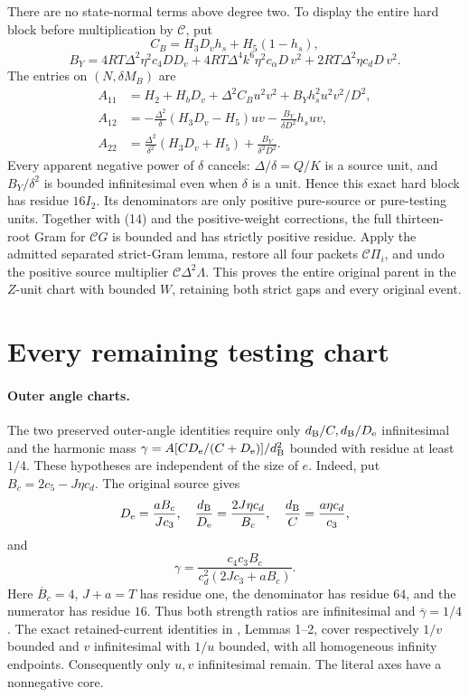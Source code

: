 There are no state-normal terms above degree two. To display the
entire hard block before multiplication by $\mathcal C$, put
\[
 C_B=H_3D_vh_s+H_5(1-h_s),
\]
\[
 B_Y=4RT\Delta^2\eta^2c_4DD_v
      +4RT\Delta^4k^6\eta^2c_\alpha D\,v^2
      +2RT\Delta^2\eta c_dD\,v^2.
\]
The entries on $(N,\delta M_B)$ are
\begin{align*}
 A_{11}&=H_2+H_bD_v+\Delta^2C_Bu^2v^2
                         +B_Yh_s^2u^2v^2/D^2,\\
 A_{12}&=-\frac{\Delta^2}{\delta}(H_3D_v-H_5)uv
                         -\frac{B_Y}{\delta D^2}h_suv,\\
 A_{22}&=\frac{\Delta^2}{\delta^2}(H_3D_v+H_5)
                         +\frac{B_Y}{\delta^2D^2}.
\end{align*}
Every apparent negative power of $\delta$ cancels: $\Delta/\delta=Q/K$
is a source unit, and $B_Y/\delta^2$ is bounded infinitesimal even
when $\delta$ is a unit. Hence this exact hard block has residue
$16I_2$. Its denominators are only positive pure-source or
pure-testing units. Together with (14) and the positive-weight
corrections, the full thirteen-root Gram for $\mathcal CG$ is bounded
and has strictly positive residue. Apply the admitted separated
strict-Gram lemma, restore all four packets $\mathcal C\Pi_i$,
and undo the positive source multiplier $\mathcal C\Delta^2\Lambda$.
This proves the entire original parent in the $Z$-unit chart with
bounded $W$, retaining both strict gaps and every original event.

\section{Every remaining testing chart}

\paragraph{Outer angle charts.}
The two preserved outer-angle identities require only
$d_{\rm B}/C,d_{\rm B}/D_{\rm e}$ infinitesimal and the harmonic
mass $\gamma=A[CD_{\rm e}/(C+D_{\rm e})]/d_{\rm B}^2$ bounded
with residue at least $1/4$. These hypotheses are independent of the
size of $e$. Indeed, put $B_c=2c_5-J\eta c_d$. The original source gives
\[
 D_{\rm e}=\frac{aB_c}{Jc_3},\quad
 \frac{d_{\rm B}}{D_{\rm e}}=\frac{2J\eta c_d}{B_c},\quad
 \frac{d_{\rm B}}C=\frac{a\eta c_d}{c_3},
\]
and
\[
 \gamma=\frac{c_4c_3B_c}{c_d^2(2Jc_3+aB_c)}.
\]
Here $\overline B_c=4$, $J+a=T$ has residue one, the denominator
has residue $64$, and the numerator has residue $16$. Thus both
strength ratios are infinitesimal and $\overline\gamma=1/4$.
The exact retained-current identities in
, Lemmas 1--2, cover respectively
$1/v$ bounded and $v$ infinitesimal with $1/u$ bounded, with all
homogeneous infinity endpoints. Consequently only $u,v$
infinitesimal remain. The literal axes have a nonnegative core.

